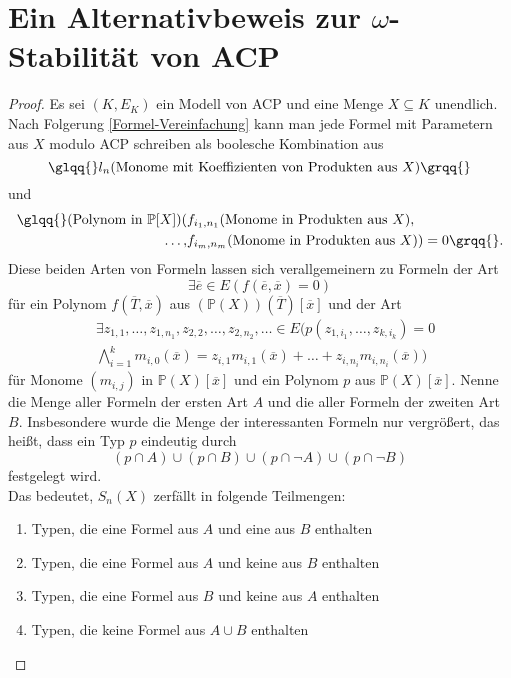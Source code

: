 \renewcommand\thesection{\Alph{section}}
\section{Ein Alternativbeweis zur $\omega$-Stabilität von ACP}

\begin{proof}
	Es sei $(K,E_K)$ ein Modell von ACP und eine Menge $X\subseteq K$ unendlich. Nach Folgerung \ref{Formel-Vereinfachung} kann man jede Formel mit Parametern aus $X$ modulo ACP schreiben als boolesche Kombination aus $$\glqq{}l_n(\text{Monome mit Koeffizienten von Produkten aus }X)\grqq{}$$ und
	\begin{align*}
	\text{\glqq{}}(\text{Polynom in }\mathbb{P}[X])(&f_{i_1,n_1}(\text{Monome in Produkten aus }X),\\\dots,&f_{i_m,n_m}(\text{Monome in Produkten aus }X))=0\grqq{}.
	\end{align*}
	Diese beiden Arten von Formeln lassen sich verallgemeinern
    zu Formeln der Art $${\exists\overline{e}\in E(f(\overline{e},\overline{x})=0)}$$ für  ein Polynom $f(\overline{T},\overline{x})$ aus $(\mathbb{P}(X))(\overline{T})[\overline{x}]$ und der Art
	\begin{align*}
	&\exists z_{1,1},\dots,z_{1,n_1},z_{2,2},\dots,z_{2,n_2},\dots\in E(p(z_{1,i_1},\dots,z_{k,i_k})=0\\
	&\bigwedge\limits_{i=1}^km_{i,0}(\overline{x})=z_{i,1}m_{i,1}(\overline{x})+\dots+z_{i,n_i}m_{i,n_i}(\overline{x}))
	\end{align*}
	für Monome $(m_{i,j})$ in $\mathbb{P}(X)[\overline{x}]$ und ein Polynom $p$ aus $\mathbb{P}(X)[\overline{x}]$. Nenne die Menge aller Formeln der ersten Art $A$ und die aller Formeln der zweiten Art $B$. Insbesondere wurde die Menge der \glqq{}interessanten\grqq{} Formeln nur vergrößert, das heißt, dass ein Typ $p$ eindeutig durch $$(p\cap A)\cup(p\cap B)\cup(p\cap\neg A)\cup(p\cap\neg B)$$ festgelegt wird.\\
	Das bedeutet, $S_n(X)$ zerfällt in folgende Teilmengen:
	\begin{enumerate}
		\item Typen, die eine Formel aus $A$ und eine aus $B$ enthalten
		\item Typen, die eine Formel aus $A$ und keine aus $B$ enthalten
		\item Typen, die eine Formel aus $B$ und keine aus $A$ enthalten
		\item Typen, die keine Formel aus $A\cup B$ enthalten

\end{enumerate}
\end{proof}
